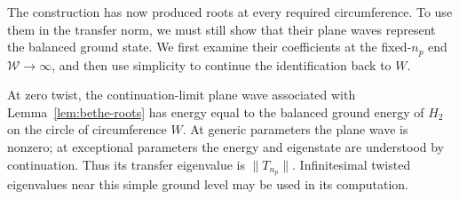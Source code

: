 The construction has now produced roots at every required circumference.
To use them in the transfer norm, we must still show that their plane
waves represent the balanced ground state.  We first examine their
coefficients at the fixed-$n_p$ end $\mathcal W\to\infty$, and then use
simplicity to continue the identification back to $W$.

\begin{proposition}\label{prop:bethe-ground}
At zero twist, the continuation-limit plane wave associated with
Lemma~\ref{lem:bethe-roots} has energy equal to the balanced ground
energy of $H_2$ on the circle of circumference $W$.  At generic parameters
the plane wave is nonzero; at exceptional parameters the energy and
eigenstate are understood by continuation.  Thus its transfer eigenvalue
is $\|T_{n_p}\|$.  Infinitesimal twisted eigenvalues near this simple
ground level may be used in its computation.
\end{proposition}

